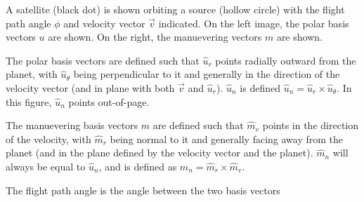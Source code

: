 \documentclass{article}
\begin{document}
A satellite (black dot) is shown orbiting a source (hollow circle) with the flight path angle $\phi$ and velocity vector $\vec{v}$ indicated. On the left image, the polar basis vectors $u$ are shown. On the right, the manuevering vectors $m$ are shown.

The polar basis vectors are defined such that $\hat{u}_r$ points radially outward from the planet, with $\hat{u}_\theta$ being perpendicular to it and generally in the direction of the velocity vector (and in plane with both $\vec{v}$ and $\hat{u}_r$). $\hat{u}_n$ is defined $\hat{u}_n=\hat{u}_r\times\hat{u}_\theta$. In this figure, $\hat{u}_n$ points out-of-page.

The manuevering basis vectors $m$ are defined such that $\hat{m}_v$ points in the direction of the velocity, with $\hat{m}_r$ being normal to it and generally facing away from the planet (and in the plane defined by the velocity vector and the planet). $\hat{m}_n$ will always be equal to $\hat{u}_n$, and is defined as $\hat{m}_n=\hat{m}_r\times\hat{m}_v$.

The flight path angle is the angle between the two basis vectors

\bigskip\bigskip
\end{document}
